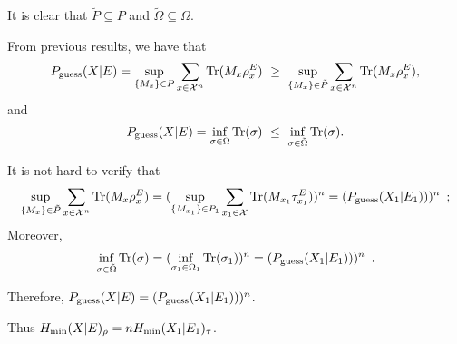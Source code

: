 \documentclass[12pt]{article}
\newcommand{\pguess}{P_{\rm guess}}
\begin{document}
\begin{enumerate}
\begin{enumerate}
It is clear that $\tilde P \subseteq P$ and $\tilde \Omega \subseteq \Omega$.

From previous results, we have that
\[
\pguess(X|E)
= \sup_{\{M_x\}\in P}\sum_{x\in\mathcal{X}^{n}}\Tr(M_x\rho_x^E)
\ \ge\ 
\sup_{\{M_x\}\in \tilde P}\sum_{x\in\mathcal{X}^{n}}\Tr(M_x\rho_x^E),
\]
and
\[
\pguess(X|E)
= \inf_{\sigma\in\Omega}\Tr(\sigma)
\ \le\ 
\inf_{\sigma\in\tilde\Omega}\Tr(\sigma).
\]

It is not hard to verify that
\begin{align*}
\sup_{\{M_x\}\in \tilde P}\sum_{x\in\mathcal{X}^{n}}\Tr(M_x\rho_x^E) = (\sup_{\{M_{x_1}\}\in P_1}\sum_{x_1\in\mathcal{X}}\Tr(M_{x_1}\tau_{x_1}^E))^n = (\pguess(X_1|E_1)))^n\enspace;	
\end{align*}
Moreover,
\begin{align*}
	\inf_{\sigma\in\tilde\Omega}\Tr(\sigma) = (\inf_{\sigma_1\in\Omega_1}\Tr(\sigma_1))^n = (\pguess(X_1|E_1)))^n\enspace.
\end{align*}

Therefore, $\pguess(X|E) = (\pguess(X_1|E_1)))^n$.

Thus $H_{\rm min}(X|E)_\rho = n H_{\rm min}(X_1|E_1)_\tau$.

\end{enumerate}
\end{enumerate}
\end{document}
